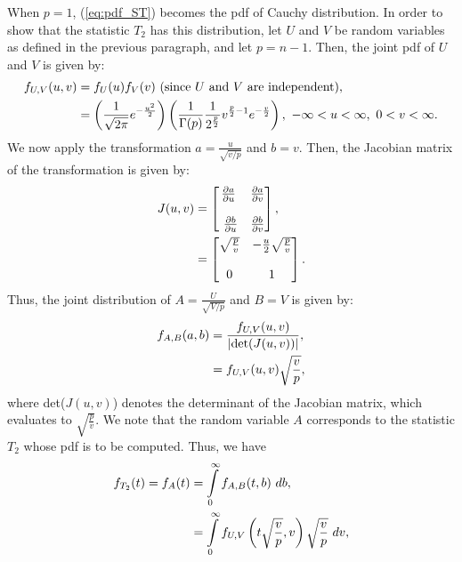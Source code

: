 \documentclass[a4paper,english,12pt]{article}
\begin{document}
When $ p=1 $, (\ref*{eq:pdf_ST}) becomes the pdf of Cauchy distribution. In order to show that the statistic $ T_{2} $ has this distribution, 
let $ U $ and $ V $ be random variables as defined in the previous paragraph, and let $ p=n-1 $. Then, the joint pdf of $ U $ and $ V $ is given by:
\begin{align}
f_{U,V}(u,v)&=f_{U}(u)f_{V}(v)~(\text{since}~U~\text{and}~V~\text{are independent}),\nonumber\\
            &=\left(\frac{1}{\sqrt{2\pi}} e^{-\frac{u^{2}}{2}}\right)\left(\frac{1}{\Gamma(p)} \frac{1}{2^{\frac{p}{2}}} v^{\frac{p}{2}-1} e^{-\frac{v}{2}}\right),~-\infty < u < \infty,~0<v<\infty.\label{eq:f_{U,V}(u,v)}
\end{align}
We now apply the transformation $ a=\frac{u}{\sqrt{v/p}} $ and $ b=v $. Then, the Jacobian matrix of the transformation is given by:
\begin{align}
J(u,v)&=\left[
\begin{matrix}
\frac{\partial a}{\partial u}&\frac{\partial a}{\partial v}\\\\\
\frac{\partial b}{\partial u}&\frac{\partial b}{\partial v}
\end{matrix}\right],\nonumber\\
       &=\left[
       \begin{matrix}
       	\sqrt{\frac{p}{v}}&-\frac{u}{2}\sqrt{\frac{p}{v}}\\\vspace{0.2pt}\\
       	0&1
       \end{matrix}\right].\label{eq:J(u,v)}
\end{align}
Thus, the joint distribution of $ A=\frac{U}{\sqrt{V/p}} $ and $ B=V $ is given by:
\begin{align}
	f_{A,B}(a,b)&=\frac{f_{U,V}(u,v)}{|\text{det}(J(u,v))|},\nonumber\\
	            &=f_{U,V}(u,v)\sqrt{\frac{v}{p}},\label{eq:f_{A,B}(a,b)}
\end{align}
where det($ J(u,v) $) denotes the determinant of the Jacobian matrix, which evaluates to $ \sqrt{\frac{p}{v}} $. We note that the random variable $ A $ corresponds to the statistic $ T_{2} $ whose pdf is to be computed. Thus, we have
\begin{align}
	f_{T_{2}}(t)=f_{A}(t)&=\int\limits_{0}^{\infty} f_{A,B}(t,b) ~db,\nonumber\\
				         &=\int\limits_{0}^{\infty} f_{U,V}\left(t\sqrt{\frac{v}{p}},v\right) \sqrt{\frac{v}{p}}~dv,\label{eq:f_{T_{2}}(t)}
\end{align} 
\end{document}
